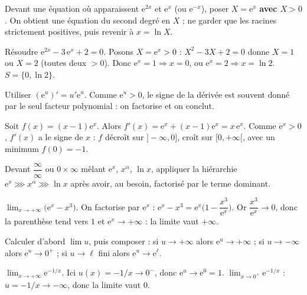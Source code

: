 Devant une équation où apparaissent $\mathrm{e}^{2x}$ et $\mathrm{e}^{x}$ (ou $\mathrm{e}^{-x}$),
poser $X=\mathrm{e}^{x}$ \textbf{avec $X>0$}. On obtient une équation du second degré en $X$ ;
ne garder que les racines strictement positives, puis revenir à $x=\ln X$.
\begin{exemple}
Résoudre $\mathrm{e}^{2x}-3\,\mathrm{e}^{x}+2=0$. Posons $X=\mathrm{e}^{x}>0$ :
$X^{2}-3X+2=0$ donne $X=1$ ou $X=2$ (toutes deux $>0$).
Donc $\mathrm{e}^{x}=1\Rightarrow x=0$, ou $\mathrm{e}^{x}=2\Rightarrow x=\ln 2$.
\;$S=\{0,\ln 2\}$.
\end{exemple}

Utiliser $(\mathrm{e}^{u})'=u'\mathrm{e}^{u}$. Comme $\mathrm{e}^{u}>0$, le signe de la dérivée
est souvent donné par le seul facteur polynomial : on factorise et on conclut.
\begin{exemple}
Soit $f(x)=(x-1)\mathrm{e}^{x}$. Alors $f'(x)=\mathrm{e}^{x}+(x-1)\mathrm{e}^{x}=x\,\mathrm{e}^{x}$.
Comme $\mathrm{e}^{x}>0$, $f'(x)$ a le signe de $x$ : $f$ décroît sur $]-\infty,0]$, croît sur
$[0,+\infty[$, avec un minimum $f(0)=-1$.
\end{exemple}

Devant $\dfrac{\infty}{\infty}$ ou $0\times\infty$ mêlant $\mathrm{e}^{x}$, $x^{\alpha}$, $\ln x$,
appliquer la hiérarchie $\mathrm{e}^{x}\ggg x^{\alpha}\ggg\ln x$ après avoir, au besoin, factorisé
par le terme dominant.
\begin{exemple}
$\displaystyle\lim_{x\to+\infty}\big(\mathrm{e}^{x}-x^{3}\big)$. On factorise par $\mathrm{e}^{x}$ :
$\mathrm{e}^{x}-x^{3}=\mathrm{e}^{x}\Big(1-\dfrac{x^{3}}{\mathrm{e}^{x}}\Big)$. Or
$\dfrac{x^{3}}{\mathrm{e}^{x}}\to 0$, donc la parenthèse tend vers $1$ et $\mathrm{e}^{x}\to+\infty$ :
la limite vaut $+\infty$.
\end{exemple}

Calculer d'abord $\displaystyle\lim u$, puis composer : si $u\to+\infty$ alors
$\mathrm{e}^{u}\to+\infty$ ; si $u\to-\infty$ alors $\mathrm{e}^{u}\to0^{+}$ ; si $u\to\ell$ fini
alors $\mathrm{e}^{u}\to\mathrm{e}^{\ell}$.
\begin{exemple}
$\displaystyle\lim_{x\to+\infty}\mathrm{e}^{-1/x}$. Ici $u(x)=-1/x\to0^{-}$, donc
$\mathrm{e}^{u}\to\mathrm{e}^{0}=1$. \;$\displaystyle\lim_{x\to0^{+}}\mathrm{e}^{-1/x}$ : $u=-1/x\to-\infty$,
donc la limite vaut $0$.
\end{exemple}

